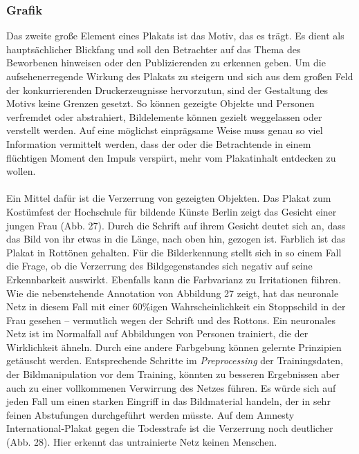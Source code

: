 \documentclass[a4paper,12pt,ngerman]{article}
\begin{document}
\subsubsection{Grafik}
Das zweite große Element eines Plakats ist das Motiv, das es trägt. Es dient als hauptsächlicher Blickfang und soll den Betrachter auf das Thema des Beworbenen hinweisen oder den Publizierenden zu erkennen geben. Um die aufsehenerregende Wirkung des Plakats zu steigern und sich aus dem großen Feld der konkurrierenden Druckerzeugnisse hervorzutun, sind der Gestaltung des Motivs keine Grenzen gesetzt. So können gezeigte Objekte und Personen verfremdet oder abstrahiert, Bildelemente können gezielt weggelassen oder verstellt werden. Auf eine möglichst einprägsame Weise muss genau so viel Information vermittelt werden, dass der oder die Betrachtende in einem flüchtigen Moment den Impuls verspürt, mehr vom Plakatinhalt entdecken zu wollen. \\
\\
Ein Mittel dafür ist die Verzerrung von gezeigten Objekten. Das Plakat zum Kostümfest der Hochschule für bildende Künste Berlin zeigt das Gesicht einer jungen Frau (Abb. 27). Durch die Schrift auf ihrem Gesicht deutet sich an, dass das Bild von ihr etwas in die Länge, nach oben hin, gezogen ist. Farblich ist das Plakat in Rottönen gehalten. Für die Bilderkennung stellt sich in so einem Fall die Frage, ob die Verzerrung des Bildgegenstandes sich negativ auf seine Erkennbarkeit auswirkt. Ebenfalls kann die Farbvarianz zu Irritationen führen. Wie die nebenstehende Annotation von Abbildung 27 zeigt, hat das neuronale Netz in diesem Fall mit einer 60\%igen Wahrscheinlichkeit ein Stoppschild in der Frau gesehen -- vermutlich wegen der Schrift und des Rottons. Ein neuronales Netz ist im Normalfall auf Abbildungen von Personen trainiert, die der Wirklichkeit ähneln. Durch eine andere Farbgebung können gelernte Prinzipien getäuscht werden. Entsprechende Schritte im \textit{Preprocessing} der Trainingsdaten, der Bildmanipulation vor dem Training, könnten zu besseren Ergebnissen aber auch zu einer vollkommenen Verwirrung des Netzes führen. Es würde sich auf jeden Fall um einen starken Eingriff in das Bildmaterial handeln, der in sehr feinen Abstufungen durchgeführt werden müsste. Auf dem Amnesty International-Plakat gegen die Todesstrafe ist die Verzerrung noch deutlicher (Abb. 28). Hier erkennt das untrainierte Netz keinen Menschen. \\
\\
\end{document}
